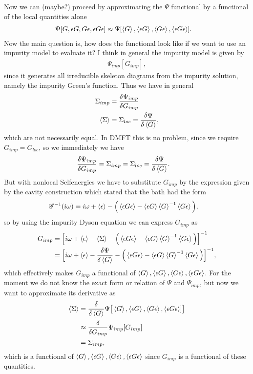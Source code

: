 \documentclass[12pt,a4paper]{scrartcl}
\numberwithin{equation}{section}
\begin{document}
Now we can (maybe?) proceed by approximating the $\Psi$ functional by a functional of
the local quantities alone
\begin{align}
 \Psi[G, \epsilon G, G \epsilon , \epsilon G \epsilon]
 &\approx \Psi[\braket{G}, \braket{\epsilon G }, \braket{G \epsilon }, \braket{\epsilon G \epsilon} ].
\end{align}
Now the main question is, how does the functional look like if we want to use an impurity model to evaluate it?
I think in general the impurity model is given by
\begin{align}
 \Psi_{imp}[G_{imp}],
\end{align}
since it generates all irreducible skeleton diagrams from the impurity solution, namely the impurity Green's function.
Thus we have in general
\begin{align}
\Sigma_{imp} &= \frac{\delta \Psi_{imp} }{\delta G_{imp}} \\
\braket{\Sigma} &= \Sigma_{loc} = \frac{\delta \Psi }{\delta \braket{G}},
\end{align}
which are not necessarily equal.
In DMFT this is no problem, since we require $G_{imp}=G_{loc}$, so we immediately
we have 
\begin{align}
\frac{\delta \Psi_{imp} }{\delta G_{imp}} &= \Sigma_{imp} =  \Sigma_{loc} = \frac{\delta \Psi }{\delta \braket{G}} .
\end{align}
But with nonlocal Selfenergies we have to substitute
$G_{imp}$ by the expression given by the cavity construction which stated that the bath had the form
\begin{align}
\mathscr{G}^{-1}(i\omega) 
 &= i\omega + \braket{\epsilon} - \Big( \braket{ \epsilon G \epsilon } - \braket{\epsilon G} \braket{G}^{-1}  \braket{ G \epsilon }  \Big),
\end{align}
so by using the impurity Dyson equation we can express $G_{imp}$ as
\begin{align}
G_{imp}
 &= \Big[ i\omega + \braket{\epsilon} -\braket{\Sigma} - \Big( \braket{ \epsilon G \epsilon } - \braket{\epsilon G} \braket{G}^{-1}  \braket{ G \epsilon }  \Big) \Big]^{-1} \\
 &= \Big[ i\omega + \braket{\epsilon} -\frac{\delta \Psi}{\delta \braket{G}} - \Big( \braket{ \epsilon G \epsilon } - \braket{\epsilon G} \braket{G}^{-1}  \braket{ G \epsilon }  \Big) \Big]^{-1},
\end{align}
which effectively makes $G_{imp}$ a functional of $\braket{G}, \braket{\epsilon G }, \braket{G \epsilon }, \braket{\epsilon G \epsilon}$.
For the moment we do not know the exact form or relation of $\Psi$ and $\Psi_{imp}$, but now we want to approximate its derivative as
\begin{align}
\braket{\Sigma}
&= 
 \frac{\delta}{\delta \braket{G}} \Psi\big[ \braket{G}, \braket{\epsilon G }, \braket{G \epsilon }, \braket{\epsilon G \epsilon}] \big] \\
 &\approx \frac{\delta}{\delta G_{imp}} \Psi_{imp} [ G_{imp}] \\
 &= \Sigma_{imp},
\end{align}
which is a functional of $\braket{G}, \braket{\epsilon G }, \braket{G \epsilon }, \braket{\epsilon G \epsilon}$ since $G_{imp}$
is a functional of these quantities.
\end{document}
